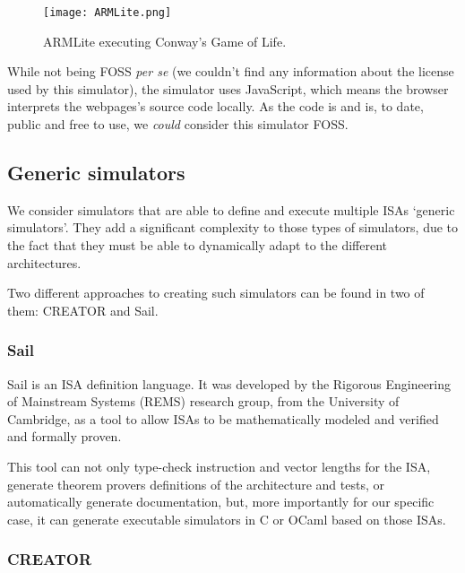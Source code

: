\begin{figure}[h]
  \caption{ARMLite executing Conway's Game of Life\normalfont\supercite{Gardner1970fantastic}.}
  \texttt{[image: ARMLite.png]}
  \label{fig:armlite}
\end{figure}

While not being \gls{FOSS} \textit{per se} (we couldn't find any information about the license used by this simulator), the simulator uses JavaScript, which means the browser interprets the webpages's source code locally. As the code is  and is, to date, public and free to use, we \textit{could} consider this simulator \gls{FOSS}.


\subsection{Generic simulators}\label{subsec:generic-assembly-simulators}
We consider simulators that are able to define and execute multiple \glspl{ISA} `generic simulators'. They add a significant complexity to those types of simulators, due to the fact that they must be able to dynamically adapt to the different architectures.

\noindent
Two different approaches to creating such simulators can be found in two of them: CREATOR\supercite{creatorZenodo} and Sail\supercite{ArmstrongAlasdair2019IsfA}.


\subsubsection*{Sail}  %
Sail\supercite{ArmstrongAlasdair2019IsfA} is an \gls{ISA} definition language. It was developed by the Rigorous Engineering of Mainstream Systems (REMS)\supercite{rems} research group, from the University of Cambridge, as a tool to allow \glspl{ISA} to be mathematically modeled and verified and formally proven.

This tool can not only type-check instruction and vector lengths for the \gls{ISA}, generate \glspl{theorem prover} definitions of the architecture and tests, or automatically generate documentation, but, more importantly for our specific case, it can generate executable simulators in C or OCaml based on those \glspl{ISA}.




\subsubsection*{CREATOR}  %





